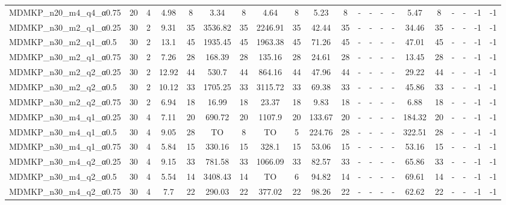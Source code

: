 \begin{sidewaystable}[!ht]
{\begin{tabular}{lcccccccccccccccccccc}
MDMKP\_n20\_m4\_q4\_α0.75 & 20 & 4 & 4.98 & 8 &  \textcolor{blue2}{3.34} & 8 & 4.64 & 8 & 5.23 & 8 &  - &  - &  - &  - & 5.47 & 8 &  - &  - & -1 & -1 \\
MDMKP\_n30\_m2\_q1\_α0.25 & 30 & 2 &  \textcolor{blue2}{9.31} & 35 & 3536.82 & 35 & 2246.91 & 35 & 42.44 & 35 &  - &  - &  - &  - & 34.46 & 35 &  - &  - & -1 & -1 \\
MDMKP\_n30\_m2\_q1\_α0.5 & 30 & 2 &  \textcolor{blue2}{13.1} & 45 & 1935.45 & 45 & 1963.38 & 45 & 71.26 & 45 &  - &  - &  - &  - & 47.01 & 45 &  - &  - & -1 & -1 \\
MDMKP\_n30\_m2\_q1\_α0.75 & 30 & 2 &  \textcolor{blue2}{7.26} & 28 & 168.39 & 28 & 135.16 & 28 & 24.61 & 28 &  - &  - &  - &  - & 13.45 & 28 &  - &  - & -1 & -1 \\
MDMKP\_n30\_m2\_q2\_α0.25 & 30 & 2 &  \textcolor{blue2}{12.92} & 44 & 530.7 & 44 & 864.16 & 44 & 47.96 & 44 &  - &  - &  - &  - & 29.22 & 44 &  - &  - & -1 & -1 \\
MDMKP\_n30\_m2\_q2\_α0.5 & 30 & 2 &  \textcolor{blue2}{10.12} & 33 & 1705.25 & 33 & 3115.72 & 33 & 69.38 & 33 &  - &  - &  - &  - & 45.86 & 33 &  - &  - & -1 & -1 \\
MDMKP\_n30\_m2\_q2\_α0.75 & 30 & 2 & 6.94 & 18 & 16.99 & 18 & 23.37 & 18 & 9.83 & 18 &  - &  - &  - &  - &  \textcolor{blue2}{6.88} & 18 &  - &  - & -1 & -1 \\
MDMKP\_n30\_m4\_q1\_α0.25 & 30 & 4 &  \textcolor{blue2}{7.11} & 20 & 690.72 & 20 & 1107.9 & 20 & 133.67 & 20 &  - &  - &  - &  - & 184.32 & 20 &  - &  - & -1 & -1 \\
MDMKP\_n30\_m4\_q1\_α0.5 & 30 & 4 &  \textcolor{blue2}{9.05} & 28 & TO & 8 & TO & 5 & 224.76 & 28 &  - &  - &  - &  - & 322.51 & 28 &  - &  - & -1 & -1 \\
MDMKP\_n30\_m4\_q1\_α0.75 & 30 & 4 &  \textcolor{blue2}{5.84} & 15 & 330.16 & 15 & 328.1 & 15 & 53.06 & 15 &  - &  - &  - &  - & 53.16 & 15 &  - &  - & -1 & -1 \\
MDMKP\_n30\_m4\_q2\_α0.25 & 30 & 4 &  \textcolor{blue2}{9.15} & 33 & 781.58 & 33 & 1066.09 & 33 & 82.57 & 33 &  - &  - &  - &  - & 65.86 & 33 &  - &  - & -1 & -1 \\
MDMKP\_n30\_m4\_q2\_α0.5 & 30 & 4 &  \textcolor{blue2}{5.54} & 14 & 3408.43 & 14 & TO & 6 & 94.82 & 14 &  - &  - &  - &  - & 69.61 & 14 &  - &  - & -1 & -1 \\
MDMKP\_n30\_m4\_q2\_α0.75 & 30 & 4 &  \textcolor{blue2}{7.7} & 22 & 290.03 & 22 & 377.02 & 22 & 98.26 & 22 &  - &  - &  - &  - & 62.62 & 22 &  - &  - & -1 & -1 \\

\end{tabular}}
\end{sidewaystable}
